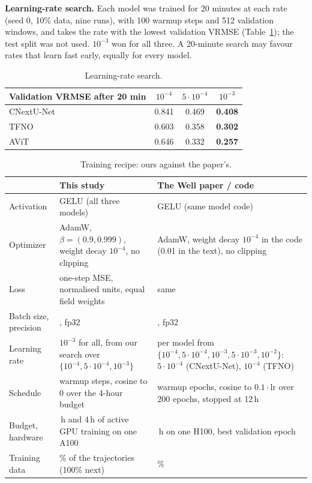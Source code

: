 \documentclass[11pt]{article}
\begin{document}
\textbf{Learning-rate search.} Each model was trained for 20 minutes at each rate (seed 0, 10\% data, nine runs),
with 100 warmup steps and 512 validation windows, and takes the rate with the lowest validation VRMSE
(Table~\ref{tab:lr}); the test split was not used. $10^{-3}$ won for all three. A 20-minute search may favour rates
that learn fast early, equally for every model.

\begin{table}[!htbp]
\centering\small
\begin{tabular}{@{}lccc@{}}
\toprule
Validation VRMSE after 20 min & $10^{-4}$ & $5\cdot10^{-4}$ & $10^{-3}$ \\
\midrule
CNextU-Net & 0.841 & 0.469 & \textbf{0.408} \\
TFNO & 0.603 & 0.358 & \textbf{0.302} \\
AViT & 0.646 & 0.332 & \textbf{0.257} \\
\bottomrule
\end{tabular}
\caption{Learning-rate search.}
\label{tab:lr}
\end{table}

\begin{table}[!htbp]
\centering\footnotesize
\begin{tabularx}{\linewidth}{@{}>{\raggedright\arraybackslash}p{2.0cm}>{\raggedright\arraybackslash}X>{\raggedright\arraybackslash}X@{}}
\toprule
& This study & The Well paper / code \\
\midrule
Activation & GELU (all three models) & GELU (same model code) \\
Optimizer & AdamW, $\beta = (0.9, 0.999)$, weight decay $10^{-4}$, no clipping & AdamW, weight decay $10^{-4}$ in the code (0.01 in the text), no clipping \\
Loss & one-step MSE, normalised units, equal field weights & same \\
Batch size, precision & 64, fp32 & 64, fp32 \\
Learning rate & $10^{-3}$ for all, from our search over $\{10^{-4}, 5\cdot10^{-4}, 10^{-3}\}$ & per model from $\{10^{-4}, 5\cdot10^{-4}, 10^{-3}, 5\cdot10^{-3}, 10^{-2}\}$: $5\cdot10^{-4}$ (CNextU-Net), $10^{-4}$ (TFNO) \\
Schedule & 500 warmup steps, cosine to 0 over the 4-hour budget & 5 warmup epochs, cosine to $0.1\cdot$lr over 200 epochs, stopped at 12\,h \\
Budget, hardware & 1\,h and 4\,h of active GPU training on one A100 & 12\,h on one H100, best validation epoch \\
Training data & 10\% of the trajectories (100\% next) & 100\% \\
\bottomrule
\end{tabularx}
\caption{Training recipe: ours against the paper's.}
\label{tab:recipe}
\end{table}
\end{document}
